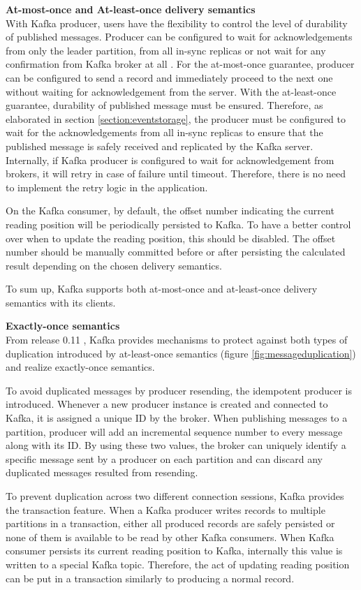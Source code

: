 \textbf{At-most-once and At-least-once delivery semantics}\\
With Kafka producer, users have the flexibility to control the level of durability of published messages. Producer can be configured to wait for acknowledgements from only the leader partition, from all in-sync replicas or not wait for any confirmation from Kafka broker at all \cite{kafkaack}. For the at-most-once guarantee, producer can be configured to send a record and immediately proceed to the next one without waiting for acknowledgement from the server. With the at-least-once guarantee, durability of published message must be ensured. Therefore, as elaborated in section \ref{section:eventstorage}, the producer must be configured to wait for the acknowledgements from all in-sync replicas to ensure that the published message is safely received and replicated by the Kafka server. Internally, if Kafka producer is configured to wait for acknowledgement from brokers, it will retry in case of failure until timeout. Therefore, there is no need to implement the retry logic in the application. 

On the Kafka consumer, by default, the offset number indicating the current reading position will be periodically persisted to Kafka. To have a better control over when to update the reading position, this should be disabled. The offset number should be manually committed before or after persisting the calculated result depending on the chosen delivery semantics.   

To sum up, Kafka supports both at-most-once and at-least-once delivery semantics with its clients.

\textbf{Exactly-once semantics}\\
From release 0.11 \cite{kafkatransaction}, Kafka provides mechanisms to protect against both types of duplication introduced by at-least-once semantics (figure \ref{fig:messageduplication}) and realize exactly-once semantics. 

To avoid duplicated messages by producer resending, the idempotent producer is introduced. Whenever a new producer instance is created and connected to Kafka, it is assigned a unique ID by the broker. When publishing messages to a partition, producer will add an incremental sequence number to every message along with its ID. By using these two values, the broker can uniquely identify a specific message sent by a producer on each partition and can discard any duplicated messages resulted from resending. 

To prevent duplication across two different connection sessions, Kafka provides the transaction feature. When a Kafka producer writes records to multiple partitions in a transaction, either all produced records are safely persisted or none of them is available to be read by other Kafka consumers. When Kafka consumer persists its current reading position to Kafka, internally this value is written to a special Kafka topic. Therefore, the act of updating reading position can be put in a transaction similarly to producing a normal record.


